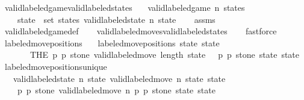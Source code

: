 \begin{isabellebody}
\isamarkupfalse%
%
\endisatagproof
{\isafoldproof}%
%
\isadelimproof
\isanewline
%
\endisadelimproof
\isanewline
{}\isamarkupfalse%
\ valid{\isacharunderscore}labeled{\isacharunderscore}game{\isacharunderscore}valid{\isacharunderscore}labeled{\isacharunderscore}states{\isacharcolon}\isanewline
\ \ \ {\isachardoublequoteopen}valid{\isacharunderscore}labeled{\isacharunderscore}game\ n\ states{\isachardoublequoteclose}\isanewline
\ \ \ {\isachardoublequoteopen}{\isasymforall}\ state\ {\isasymin}\ set\ states{\isachardot}\ valid{\isacharunderscore}labeled{\isacharunderscore}state\ n\ state{\isachardoublequoteclose}\isanewline
%
\isadelimproof
\ \ %
\endisadelimproof
%
\isatagproof
{}\isamarkupfalse%
\ assms\isanewline
\ \ \isamarkupfalse%
\ valid{\isacharunderscore}labeled{\isacharunderscore}game{\isacharunderscore}def\isanewline
\ \ \isamarkupfalse%
\ valid{\isacharunderscore}labeled{\isacharunderscore}moves{\isacharunderscore}valid{\isacharunderscore}labeled{\isacharunderscore}states\isanewline
\ \ \isamarkupfalse%
\ fastforce%
\endisatagproof
{\isafoldproof}%
%
\isadelimproof
\isanewline
%
\endisadelimproof
\isanewline
{}\isamarkupfalse%
\ labeled{\isacharunderscore}move{\isacharunderscore}positions\ \isanewline
\ \ {\isachardoublequoteopen}labeled{\isacharunderscore}move{\isacharunderscore}positions\ state\ state{\isacharprime}\ {\isacharequal}\ \isanewline
\ \ \ \ \ \ \ {\isacharparenleft}THE\ {\isacharparenleft}p{}{\isacharcomma}\ p{}{\isacharcomma}\ stone{\isacharparenright}{\isachardot}\ valid{\isacharunderscore}labeled{\isacharunderscore}move{\isacharprime}\ {\isacharparenleft}length\ state\ {\isacharminus}\ {}{\isacharparenright}\ p{}\ p{}\ stone\ state\ state{\isacharprime}{\isacharparenright}{\isachardoublequoteclose}\isanewline
\isanewline
{}\isamarkupfalse%
\ labeled{\isacharunderscore}move{\isacharunderscore}positions{\isacharunderscore}unique{\isacharcolon}\isanewline
\ \ \ {\isachardoublequoteopen}valid{\isacharunderscore}labeled{\isacharunderscore}state\ n\ state{\isachardoublequoteclose}\ {\isachardoublequoteopen}valid{\isacharunderscore}labeled{\isacharunderscore}move\ n\ state\ state{\isacharprime}{\isachardoublequoteclose}\isanewline
\ \ \ {\isachardoublequoteopen}{\isasymexists}{\isacharbang}\ {\isacharparenleft}p{}{\isacharcomma}\ p{}{\isacharcomma}\ stone{\isacharparenright}{\isachardot}\ valid{\isacharunderscore}labeled{\isacharunderscore}move{\isacharprime}\ n\ p{}\ p{}\ stone\ state\ state{\isacharprime}{\isachardoublequoteclose}\isanewline

\end{isabellebody}
